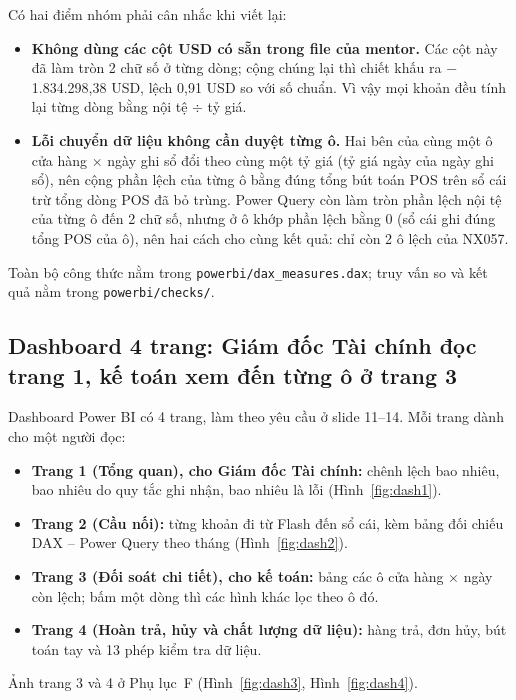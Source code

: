 \begin{table}[H]
\label{tab:dax}
\centering
{\small}
\end{table}

Có hai điểm nhóm phải cân nhắc khi viết lại:
\begin{itemize}
  \item \textbf{Không dùng các cột USD có sẵn trong file của mentor.} Các cột này đã làm tròn 2 chữ số ở từng dòng; cộng chúng lại thì chiết khấu ra $-$1.834.298,38 USD, lệch 0,91 USD so với số chuẩn. Vì vậy mọi khoản đều tính lại từng dòng bằng nội tệ $\div$ tỷ giá.
  \item \textbf{Lỗi chuyển dữ liệu không cần duyệt từng ô.} Hai bên của cùng một ô cửa hàng $\times$ ngày ghi sổ đổi theo cùng một tỷ giá (tỷ giá ngày của ngày ghi sổ), nên cộng phần lệch của từng ô bằng đúng tổng bút toán POS trên sổ cái trừ tổng dòng POS đã bỏ trùng. Power Query còn làm tròn phần lệch nội tệ của từng ô đến 2 chữ số, nhưng ở \SoOCuaHangKhop{} ô khớp phần lệch bằng 0 (sổ cái ghi đúng tổng POS của ô), nên hai cách cho cùng kết quả: chỉ còn 2 ô lệch của NX057.
\end{itemize}

Toàn bộ công thức nằm trong \texttt{powerbi/dax\_measures.dax}; truy vấn so và kết quả nằm trong \texttt{powerbi/checks/}.

\subsection{Dashboard 4 trang: Giám đốc Tài chính đọc trang 1, kế toán xem đến từng ô ở trang 3}

Dashboard Power BI có 4 trang, làm theo yêu cầu ở slide 11--14. Mỗi trang dành cho một người đọc:
\begin{itemize}
  \item \textbf{Trang 1 (Tổng quan), cho Giám đốc Tài chính:} chênh lệch bao nhiêu, bao nhiêu do quy tắc ghi nhận, bao nhiêu là lỗi (Hình~\ref{fig:dash1}).
  \item \textbf{Trang 2 (Cầu nối):} từng khoản đi từ Flash đến sổ cái, kèm bảng đối chiếu DAX -- Power Query theo tháng (Hình~\ref{fig:dash2}).
  \item \textbf{Trang 3 (Đối soát chi tiết), cho kế toán:} bảng các ô cửa hàng $\times$ ngày còn lệch; bấm một dòng thì các hình khác lọc theo ô đó.
  \item \textbf{Trang 4 (Hoàn trả, hủy và chất lượng dữ liệu):} hàng trả, đơn hủy, bút toán tay và 13 phép kiểm tra dữ liệu.
\end{itemize}
Ảnh trang 3 và 4 ở Phụ lục~F (Hình~\ref{fig:dash3}, Hình~\ref{fig:dash4}).

